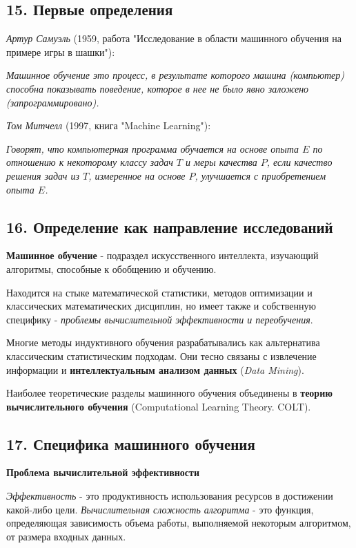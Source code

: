 \subsection{15. Первые определения}

\textit{Артур Самуэль} (1959, работа "Исследование в области машинного обучения
на примере игры в шашки"):

\textit{Машинное обучение это процесс, в результате которого машина (компьютер)
способна показывать поведение, которое в нее не было явно заложено
(запрограммировано).}

\textit{Том Митчелл} (1997, книга "Machine Learning"):

\textit{Говорят, что компьютерная программа обучается на основе опыта $E$ по
отношению к некоторому классу задач $T$ и меры качества $P$, если
качество решения задач из $T$, измеренное на основе $P$, улучшается с
приобретением опыта $E$.}

\subsection{16. Определение как направление исследований}

\textbf{Машинное обучение} - подраздел искусственного интеллекта, изучающий
алгоритмы, способные к обобщению и обучению.

Находится на стыке математической статистики, методов оптимизации и
классических математических дисциплин, но имеет также и собственную
специфику - \textit{проблемы вычислительной эффективности и переобучения}.

Многие методы индуктивного обучения разрабатывались как альтернатива
классическим статистическим подходам. Они тесно связаны с извлечение
информации и \textbf{интеллектуальным анализом данных} (\textit{Data Mining}).

Наиболее теоретические разделы машинного обучения объединены в
\textbf{теорию вычислительного обучения} (Computational Learning Theory. COLT).

\subsection{17. Специфика машинного обучения}

\textbf{Проблема вычислительной эффективности}

\textit{Эффективность} - это продуктивность использования ресурсов в достижении
какой-либо цели.
\textit{Вычислительная сложность алгоритма} - это функция, определяющая зависимость
объема работы, выполняемой некоторым алгоритмом, от размера входных данных.

